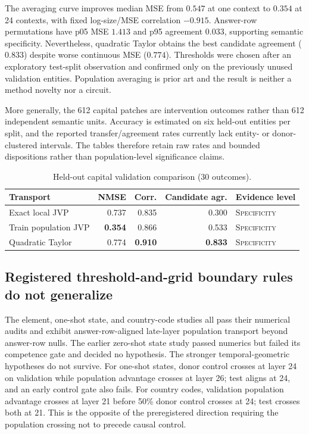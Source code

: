 \documentclass[10pt]{article}
\newcommand{\level}[1]{{\scriptsize\textsc{#1}}}
\begin{document}
The averaging curve improves median MSE from $0.547$ at one context to $0.354$
at 24 contexts, with fixed log-size/MSE correlation $-0.915$.  Answer-row
permutations have p05 MSE $1.413$ and p95 agreement $0.033$, supporting semantic
specificity.  Nevertheless, quadratic Taylor obtains the best candidate
agreement ($0.833$) despite worse continuous MSE ($0.774$).  Thresholds were
chosen after an exploratory test-split observation and confirmed only on the
previously unused validation entities.  Population averaging is prior art and
the result is neither a method novelty nor a circuit.

More generally, the 612 capital patches are intervention outcomes rather than
612 independent semantic units.  Accuracy is estimated on six held-out
entities per split, and the reported transfer/agreement rates currently lack
entity- or donor-clustered intervals.  The tables therefore retain raw rates
and bounded dispositions rather than population-level significance claims.

\begin{table}[t]
\centering
\small
\caption{Held-out capital validation comparison (30 outcomes).}
\label{tab:population}
\begin{tabular}{@{}lrrrl@{}}
\toprule
Transport & NMSE & Corr. & Candidate agr. & Evidence level \\
\midrule
Exact local JVP & 0.737 & 0.835 & 0.300 & \level{Specificity} \\
Train population JVP & \textbf{0.354} & 0.866 & 0.533 & \level{Specificity} \\
Quadratic Taylor & 0.774 & \textbf{0.910} & \textbf{0.833} & \level{Specificity} \\
\bottomrule
\end{tabular}
\end{table}

\subsection{Registered threshold-and-grid boundary rules do not generalize}

The element, one-shot state, and country-code studies all pass their numerical
audits and exhibit answer-row-aligned late-layer population transport beyond
answer-row nulls.  The earlier zero-shot state study passed numerics but failed
its competence gate and decided no hypothesis.  The stronger
temporal-geometric hypotheses do not survive.
For one-shot states, donor control crosses at layer 24 on validation while
population advantage crosses at layer 26; test aligns at 24, and an early
control gate also fails.  For country codes, validation population advantage
crosses at layer 21 before 50\% donor control crosses at 24; test crosses both
at 21.  This is the opposite of the preregistered direction requiring the
population crossing not to precede causal control.
\end{document}
